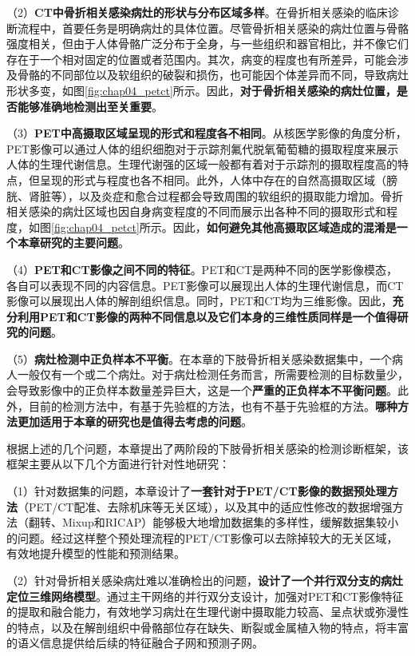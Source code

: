 （2）\textbf{CT中骨折相关感染病灶的形状与分布区域多样}。在骨折相关感染的临床诊断流程中，首要任务是明确病灶的具体位置。尽管骨折相关感染的病灶位置与骨骼强度相关，但由于人体骨骼广泛分布于全身，与一些组织和器官相比，并不像它们存在于一个相对固定的位置或者范围内。其次，病变的程度也有所差异，可能会涉及骨骼的不同部位以及软组织的破裂和损伤，也可能因个体差异而不同，导致病灶形状多变，如图\ref{fig:chap04_petct}所示。因此，\textbf{对于骨折相关感染的病灶位置，是否能够准确地检测出至关重要}。

（3）\textbf{PET中高摄取区域呈现的形式和程度各不相同}。从核医学影像的角度分析，PET影像可以通过人体的组织细胞对于示踪剂氟代脱氧葡萄糖的摄取程度来展示人体的生理代谢信息。生理代谢强的区域一般都有着对于示踪剂的摄取程度高的特点，但呈现的形式与程度也各不相同。此外，人体中存在的自然高摄取区域（膀胱、肾脏等），以及炎症和愈合过程都会导致周围的软组织的摄取能力增加。骨折相关感染的病灶区域也因自身病变程度的不同而展示出各种不同的摄取形式和程度，如图\ref{fig:chap04_petct}所示。因此，\textbf{如何避免其他高摄取区域造成的混淆是一个本章研究的主要问题}。

（4）\textbf{PET和CT影像之间不同的特征}。PET和CT是两种不同的医学影像模态，各自可以表现不同的内容信息。PET影像可以展现出人体的生理代谢信息，而CT影像可以展现出人体的解剖组织信息。同时，PET和CT均为三维影像。因此，\textbf{充分利用PET和CT影像的两种不同信息以及它们本身的三维性质同样是一个值得研究的问题}。

（5）\textbf{病灶检测中正负样本不平衡}。在本章的下肢骨折相关感染数据集中，一个病人一般仅有一个或二个病灶。对于病灶检测任务而言，所需要检测的目标数量少，会导致影像中的正负样本数量差异巨大，这是一个\textbf{严重的正负样本不平衡问题}。此外，目前的检测方法中，有基于先验框的方法，也有不基于先验框的方法。\textbf{哪种方法更加适用于本章的研究也是值得去考虑的问题}。

根据上述的几个问题，本章提出了两阶段的下肢骨折相关感染的检测诊断框架，该框架主要从以下几个方面进行针对性地研究：

（1）针对数据集的问题，本章设计了\textbf{一套针对于PET/CT影像的数据预处理方法}（PET/CT配准、去除机床等无关区域），以及其中的适应性修改的数据增强方法（翻转、Mixup\cite{zhang2018mixup}和RICAP\cite{takahashi2018ricap}）能够极大地增加数据集的多样性，缓解数据集较小的问题。经过这样整个预处理流程的PET/CT影像可以去除掉较大的无关区域，有效地提升模型的性能和预测结果。

（2）针对骨折相关感染病灶难以准确检出的问题，\textbf{设计了一个并行双分支的病灶定位三维网络模型}。通过主干网络的并行双分支设计，加强对PET和CT影像特征的提取和融合能力，有效地学习病灶在生理代谢中摄取能力较高、呈点状或弥漫性的特点，以及在解剖组织中骨骼部位存在缺失、断裂或金属植入物的特点，将丰富的语义信息提供给后续的特征融合子网和预测子网。

